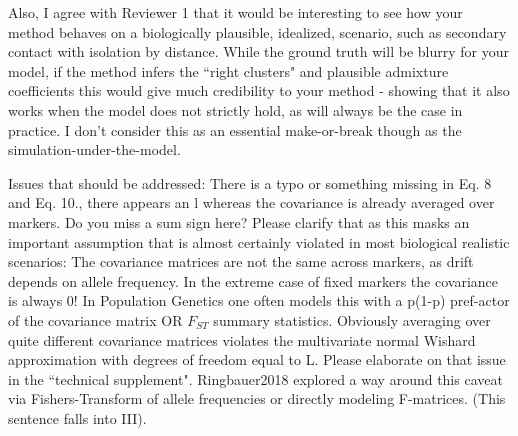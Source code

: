 \begin{point}{}
    Also, I agree with Reviewer 1 that it would be interesting to see how your method behaves on a biologically plausible, 
idealized, scenario, such as secondary contact with isolation by distance. 
While the ground truth will be blurry for your model, 
if the method infers the ``right clusters" and plausible admixture coefficients 
this would give much credibility to your method - 
showing that it also works when the model does not strictly hold, 
as will always be the case in practice. 
I don't consider this as an essential make-or-break though as the simulation-under-the-model.
\end{point}


\begin{point}{}
    Issues that should be addressed:
 There is a typo or something missing in Eq. 8 and Eq. 10., 
 there appears an l whereas the covariance is already averaged over markers. 
 Do you miss a sum sign here? 
 Please clarify that as this masks an important assumption 
 that is almost certainly violated in most biological realistic scenarios:
The covariance matrices are not the same across markers, 
as drift depends on allele frequency. 
In the extreme case of fixed markers the covariance is always 0! 
In Population Genetics one often models this with a p(1-p) 
pref-actor of the covariance matrix OR $F_{ST}$ summary statistics. 
Obviously averaging over quite different covariance matrices 
violates the multivariate normal Wishard approximation with 
degrees of freedom equal to L. 
Please elaborate on that issue in the ``technical supplement".
Ringbauer2018 explored a way around this caveat via Fishers-Transform of allele
frequencies or directly modeling F-matrices. (This sentence falls into III).
\end{point}


